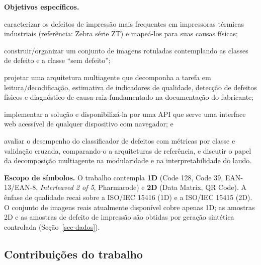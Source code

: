 \documentclass[
	article,			%
	11pt,				%
	oneside,			%
	a4paper,			%
	english,			%
	brazilian,			%
	sumario=tradicional
	]{abntex2}
\begin{document}
\noindent\textbf{Objetivos específicos.}
\begin{alineas}
	\item caracterizar os defeitos de impressão mais frequentes em impressoras
	térmicas industriais (referência: Zebra série ZT) e mapeá-los para suas
	causas físicas;
	\item construir/organizar um conjunto de imagens rotuladas contemplando as
	classes de defeito e a classe ``sem defeito'';
	\item projetar uma arquitetura multiagente que decomponha a tarefa em
	leitura/decodificação, estimativa de indicadores de qualidade, detecção de
	defeitos físicos e diagnóstico de causa-raiz fundamentado na documentação do
	fabricante;
	\item implementar a solução e disponibilizá-la por uma API que serve uma
	interface web acessível de qualquer dispositivo com navegador; e
	\item avaliar o desempenho do classificador de defeitos com métricas por classe
	e validação cruzada, comparando-o a arquiteturas de referência, e discutir o
	papel da decomposição multiagente na modularidade e na interpretabilidade do
	laudo.
\end{alineas}

\noindent\textbf{Escopo de símbolos.} O trabalho contempla \textbf{1D} (Code 128,
Code 39, EAN-13/EAN-8, \textit{Interleaved 2 of 5}, Pharmacode) e \textbf{2D}
(Data Matrix, QR Code). A ênfase de qualidade recai sobre a ISO/IEC 15416 (1D) e
a ISO/IEC 15415 (2D). O conjunto de imagens reais atualmente disponível cobre
apenas 1D; as amostras 2D e as amostras de defeito de impressão são obtidas por
geração sintética controlada (Seção~\ref{sec-dados}).

\subsection{Contribuições do trabalho}
\end{document}
